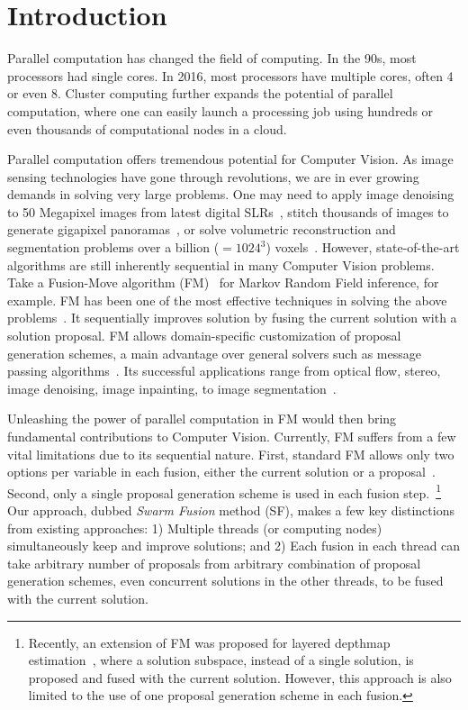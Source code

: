 \section{Introduction}
Parallel computation has changed the field of computing.  In the 90s,
most processors had single cores. In 2016, most processors have multiple
cores, often 4 or even 8. Cluster computing further expands the
potential of parallel computation, where one can easily launch a
processing job using hundreds or even thousands of computational nodes
in a cloud.


Parallel computation offers tremendous potential for Computer Vision. As
image sensing technologies have gone through revolutions, we are in
ever growing demands in solving very large problems. One may need to
apply image denoising to 50 Megapixel images from latest digital
SLRs~\cite{canon?}, stitch thousands of images to generate gigapixel
panoramas~\cite{gigapan}, or solve volumetric reconstruction and
segmentation problems over a billion ($=1024^3$)
voxels~\cite{Joint3DSceneReconstructionandclassSegmentation}.
%
However, state-of-the-art algorithms are still inherently sequential in
many Computer Vision problems. Take a Fusion-Move algorithm
(FM)~\cite{viktor,second_order_stereo,else} for Markov Random Field
inference, for example. FM has been one of the most effective techniques
in solving the above
problems~\cite{fusion_moves_for_markov_random_field_optimization}.
%
It sequentially improves solution by fusing the current solution with a
solution proposal. FM allows domain-specific customization of proposal
generation schemes, a main advantage over general solvers such as
message passing algorithms~\cite{TRW,loopy_belief_propagation}.  Its
successful applications range from optical flow, stereo, image
denoising, image inpainting, to image
segmentation~\cite{fusion_moves_for_markov_random_field_optimization}.


Unleashing the power of parallel computation in FM
would then bring fundamental contributions to Computer
Vision. Currently, FM suffers from a few vital limitations due to its
sequential nature. First, standard FM allows only two options per
variable in each fusion, either the current solution or a
proposal~\cite{fusion_moves_for_markov_random_field_optimization}. Second,
only a single proposal generation scheme is used in each fusion
step.~\footnote{Recently, an extension of FM was proposed for layered
depthmap estimation~\cite{chen_2016}, where a solution subspace, instead
of a single solution, is proposed and fused with the current
solution. However, this approach is also limited to the use of one proposal
generation scheme in each fusion.}
%
Our approach, dubbed {\it Swarm Fusion} method (SF), makes a
few key distinctions from existing approaches: 1) Multiple threads (or
computing nodes) simultaneously keep and improve solutions; and 2) Each
fusion in each thread can take arbitrary number of proposals from
arbitrary combination of proposal generation schemes, even concurrent
solutions in the other threads, to be fused with the current solution.
%


